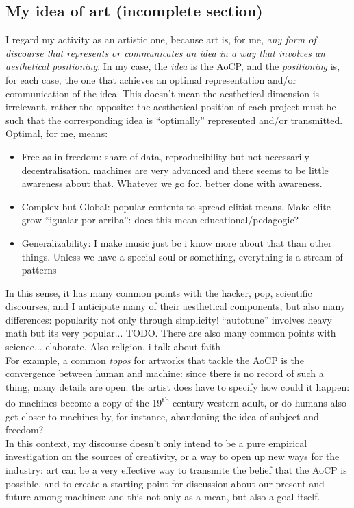 \documentclass[11pt]{scrartcl} %
\begin{document}
\subsection*{My idea of art (incomplete section)}
I regard my activity as an artistic one, because art is, for me, {\it any form of discourse that represents or communicates an idea in a way that involves an aesthetical positioning}. In my case, the {\it idea} is the AoCP, and the {\it positioning} is, for each case, the one that achieves an optimal representation and/or communication of the idea. This doesn't mean the aesthetical dimension is irrelevant, rather the opposite: the aesthetical position of each project must be such that the corresponding idea is ``optimally'' represented and/or transmitted. Optimal, for me, means:
\begin{itemize}
\item Free as in freedom: share of data, reproducibility but not necessarily decentralisation. machines are very advanced and there seems to be little awareness about that. Whatever we go for, better done with awareness.
\item Complex but Global: popular contents to spread elitist means. Make elite grow ``igualar por arriba'': does this mean educational/pedagogic?
\item Generalizability: I make music just bc i know more about that than other things. Unless we have a special soul or something, everything is a stream of patterns
\end{itemize}
In this sense, it has many common points with the hacker, pop, scientific discourses, and I anticipate many of their aesthetical components, but also many differences: popularity not only through simplicity! ``autotune'' involves heavy math but its very popular... TODO.
There are also many common points with science... elaborate. Also religion, i talk about faith \\
For example, a common {\it topos} for artworks that tackle the AoCP is the convergence between human and machine: since there is no record of such a thing, many details are open: the artist does have to specify how could it happen: do machines become a copy of the 19\textsuperscript{th} century western adult, or do humans also get closer to machines by, for instance, abandoning the idea of subject and freedom?\\[7pt]
In this context, my discourse doesn't only intend to be a pure empirical investigation on the sources of creativity, or a way to open up new ways for the industry: art can be a very effective way to transmite the belief that the AoCP is possible, and to create a starting point for discussion about our present and future among machines: and this not only as a mean, but also a goal itself.
\end{document}
